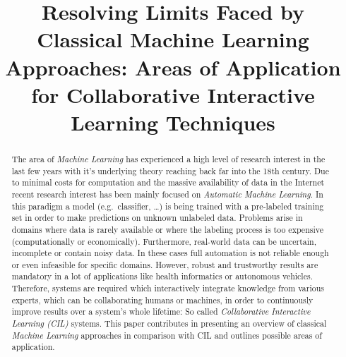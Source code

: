 \documentclass[conference]{IEEEtran}
\begin{document}
\title{Resolving Limits Faced by Classical Machine Learning Approaches: Areas of Application for 
Collaborative Interactive Learning Techniques}


\author{
}

\maketitle

\begin{abstract}
The area of \textit{Machine Learning} has experienced a high 
level of research interest in the last few years with it's underlying 
theory reaching back far into the 18th century. Due to minimal 
costs for computation and the massive availability of data in the 
Internet recent research interest has been mainly focused on 
\textit{Automatic Machine Learning}. In this paradigm a model 
(e.g.\ classifier, \dots) is being trained with a pre-labeled training 
set in order to make predictions on unknown unlabeled data. Problems arise 
in domains where data is rarely available or where the labeling process is 
too expensive (computationally or economically). Furthermore, real-world data 
can be uncertain, incomplete or contain noisy data. In these cases 
full automation is not reliable enough or even infeasible for specific 
domains. However, robust and trustworthy results are mandatory in a lot of 
applications like health informatics or autonomous vehicles. 
Therefore, systems are required which interactively integrate knowledge from 
various experts, which can be collaborating humans or machines, in order 
to continuously improve results over a system's whole lifetime: So called 
\textit{Collaborative Interactive Learning (CIL)} systems.
This paper contributes in presenting an overview of classical \textit{Machine Learning} 
approaches in comparison with CIL and outlines possible areas of application. 
\end{abstract}
\end{document}
